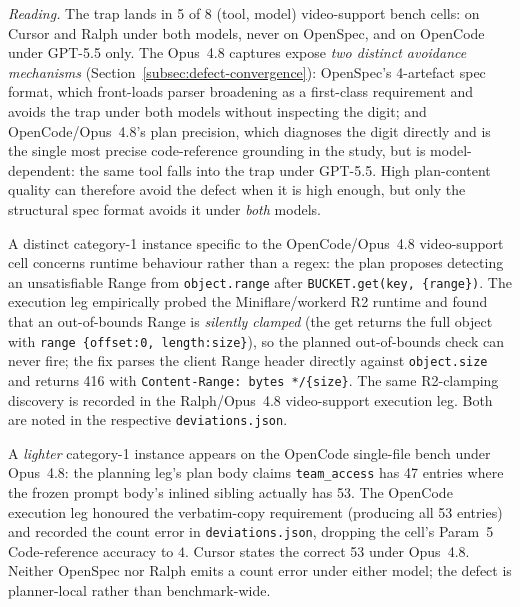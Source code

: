 \emph{Reading.} The trap lands in 5 of 8 (tool, model) video-support bench
cells: on Cursor and Ralph under both models, never on OpenSpec, and
on OpenCode under GPT-5.5 only. The Opus~4.8 captures expose
\emph{two distinct avoidance mechanisms}
(Section~\ref{subsec:defect-convergence}): OpenSpec's 4-artefact spec format,
which front-loads parser broadening as a first-class requirement and
avoids the trap under both models without inspecting the digit; and
OpenCode/Opus~4.8's plan precision, which diagnoses the digit directly
and is the single most precise code-reference grounding in the study,
but is model-dependent: the same tool falls into the trap under
GPT-5.5. High plan-content quality can therefore avoid the defect when
it is high enough, but only the structural spec format avoids it under
\emph{both} models.

A distinct category-1 instance specific to the OpenCode/Opus~4.8
video-support cell concerns runtime behaviour rather than a regex: the plan
proposes detecting an unsatisfiable Range from \texttt{object.range}
after \texttt{BUCKET.get(key, \{range\})}. The execution leg
empirically probed the Miniflare/workerd R2 runtime and found that an
out-of-bounds Range is \emph{silently clamped} (the get returns the
full object with \texttt{range \{offset:0, length:size\}}), so the
planned out-of-bounds check can never fire; the fix parses the client
Range header directly against \texttt{object.size} and returns 416
with \texttt{Content-Range: bytes */\{size\}}. The same R2-clamping
discovery is recorded in the Ralph/Opus~4.8 video-support execution leg.
Both are noted in the respective \texttt{deviations.json}.

A \emph{lighter} category-1 instance appears on the OpenCode single-file
bench under Opus~4.8: the planning leg's plan body claims
\texttt{team\_access} has 47 entries where the frozen prompt body's
inlined sibling actually has 53. The OpenCode execution leg honoured
the verbatim-copy requirement (producing all 53 entries) and recorded
the count error in \texttt{deviations.json}, dropping the cell's
Param~5 Code-reference accuracy to $4$. Cursor states the correct 53
under Opus~4.8. Neither OpenSpec nor Ralph emits a count error under
either model; the defect is planner-local rather than benchmark-wide.

